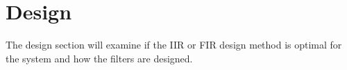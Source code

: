 \section{Design}
The design section will examine if the \gls{IIR} or \gls{FIR} design method is optimal for the system and how the filters are designed. 

  